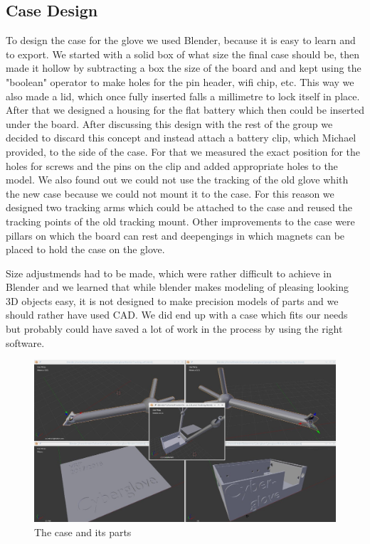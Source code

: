 \subsection{Case Design}
To design the case for the glove we used Blender, because it is easy to learn and to export. We started with a solid box of what size the final case should be, then made it hollow by subtracting a box the size of the board and and kept using the "boolean" operator to make holes for the pin header, wifi chip, etc. This way we also made a lid, which once fully inserted falls a millimetre to lock itself in place. After that we designed a housing for the flat battery which then could be inserted under the board. After discussing this design with the rest of the group we decided to discard this concept and instead attach a battery clip, which Michael provided, to the side of the case. For that we measured the exact position for the holes for screws and the pins on the clip and added appropriate holes to the model. We also found out we could not use the tracking of the old glove whith the new case because we could not mount it to the case. For this reason we designed two tracking arms which could be attached to the case and reused the tracking points of the old tracking mount. Other improvements to the case were pillars on which the board can rest and deepengings in which magnets can be placed to hold the case on the glove. 

Size adjustmends had to be made, which were rather difficult to achieve in Blender and we learned that while blender makes modeling of pleasing looking 3D objects easy, it is not designed to make precision models of parts and we should rather have used CAD. We did end up with a case which fits our needs but probably could have saved a lot of work in the process by using the right software.

\begin{figure}
	\centering
	\includegraphics[width=\textwidth]{./Screenshots/Case-Screenshot.jpg}
	\caption{The case and its parts}
	\label{img:grafik-dummy}
\end{figure}